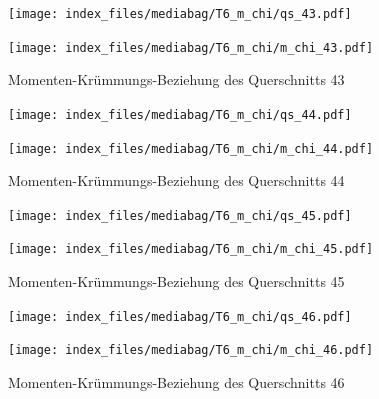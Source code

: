 \documentclass[
  11pt,
  letterpaper,
]{scrreprt}
\begin{document}
\begin{figure}[H]

\begin{minipage}{0.50\linewidth}
\texttt{[image: index\_files/mediabag/T6\_m\_chi/qs\_43.pdf]}\end{minipage}%
%
\begin{minipage}{0.50\linewidth}
\texttt{[image: index\_files/mediabag/T6\_m\_chi/m\_chi\_43.pdf]}\end{minipage}%

\caption{\label{fig-mchi_anhang}Momenten-Krümmungs-Beziehung des
Querschnitts 43}

\end{figure}%

\begin{figure}[H]

\begin{minipage}{0.50\linewidth}
\texttt{[image: index\_files/mediabag/T6\_m\_chi/qs\_44.pdf]}\end{minipage}%
%
\begin{minipage}{0.50\linewidth}
\texttt{[image: index\_files/mediabag/T6\_m\_chi/m\_chi\_44.pdf]}\end{minipage}%

\caption{\label{fig-mchi_anhang}Momenten-Krümmungs-Beziehung des
Querschnitts 44}

\end{figure}%

\begin{figure}[H]

\begin{minipage}{0.50\linewidth}
\texttt{[image: index\_files/mediabag/T6\_m\_chi/qs\_45.pdf]}\end{minipage}%
%
\begin{minipage}{0.50\linewidth}
\texttt{[image: index\_files/mediabag/T6\_m\_chi/m\_chi\_45.pdf]}\end{minipage}%

\caption{\label{fig-mchi_anhang}Momenten-Krümmungs-Beziehung des
Querschnitts 45}

\end{figure}%

\begin{figure}[H]

\begin{minipage}{0.50\linewidth}
\texttt{[image: index\_files/mediabag/T6\_m\_chi/qs\_46.pdf]}\end{minipage}%
%
\begin{minipage}{0.50\linewidth}
\texttt{[image: index\_files/mediabag/T6\_m\_chi/m\_chi\_46.pdf]}\end{minipage}%

\caption{\label{fig-mchi_anhang}Momenten-Krümmungs-Beziehung des
Querschnitts 46}

\end{figure}%
\end{document}
